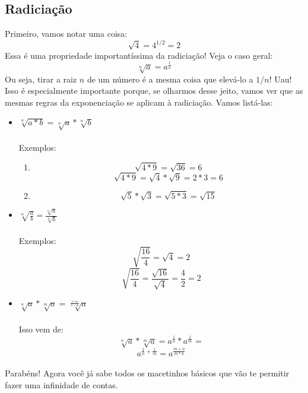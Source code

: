 \documentclass[11pt]{article}
\begin{document}
\subsection{Radiciação}
Primeiro, vamos notar uma coisa: 
$$\sqrt{4} = 4^{1/2} = 2$$
Essa é uma propriedade importantíssima da radiciação! Veja o caso geral:
$$\sqrt[n]{a} = a^{\frac{1}{a}}$$
Ou seja, tirar a raiz $n$ de um número é a mesma coisa que elevá-lo a $1/n$!
Uau! Isso é especialmente importante porque, se olharmos desse jeito, vamos
ver que as mesmas regras da exponenciação se aplicam à radiciação. Vamos 
listá-las:
\begin{itemize}
	\item $\sqrt[n]{a*b} = \sqrt[n]{a}*\sqrt[n]{b}$
	\paragraph{}
	Exemplos:
	\begin{enumerate}
		\item 
		$$\sqrt{4*9} = \sqrt{36} = 6$$
		$$\sqrt{4*9} = \sqrt{4}*\sqrt{9} = 2*3 = 6$$
		\item
		$$\sqrt{5}*\sqrt{3} = \sqrt{5*3} = \sqrt{15}$$
	\end{enumerate}

	\item $\sqrt[n]{\frac{a}{b}} = \frac{\sqrt[n]{a}}{\sqrt[n]{b}}$
	\paragraph{}
	Exemplos:
	$$\sqrt{\frac{16}{4}} = \sqrt{4} = 2$$
	$$\sqrt{\frac{16}{4}} = \frac{\sqrt{16}}{\sqrt{4}} = \frac{4}{2} = 2$$

	\item $\sqrt[n]{a}*\sqrt[m]{a} = \sqrt[\frac{n*m}{n+m}]{a}$
	\paragraph{}
	Isso vem de:
	$$\sqrt[n]{a}*\sqrt[m]{a} = a^{\frac{1}{n}}*a^{\frac{1}{m}} = $$
	$$a^{\frac{1}{n} + \frac{1}{m}} = a^{\frac{m+n}{m*n}}$$
\end{itemize}

\paragraph{}
Parabéns! Agora você já sabe todos os macetinhos básicos que vão te permitir
fazer uma infinidade de contas.
\end{document}
